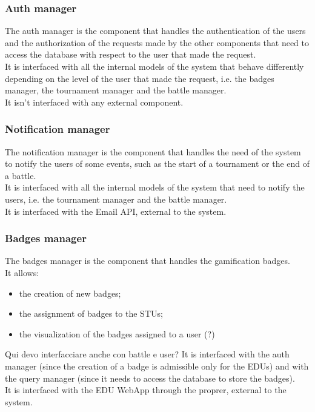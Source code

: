 \subsubsection*{Auth manager}
The auth manager is the component that handles the authentication of the users and the authorization of the requests made by the other components that need to access the database with respect to the user that made the request.\\
It is interfaced with all the internal models of the system that behave differently depending on the level of the user that made the request, i.e. the badges manager, the tournament manager and the battle manager.\\
It isn't interfaced with any external component.

\subsubsection*{Notification manager}
The notification manager is the component that handles the need of the system to notify the users of some events, such as the start of a tournament or the end of a battle.\\
It is interfaced with all the internal models of the system that need to notify the users, i.e. the tournament manager and the battle manager.\\
It is interfaced with the Email API, external to the system.

\subsubsection*{Badges manager}
The badges manager is the component that handles the gamification badges.\\
It allows:
\begin{itemize}
    \item the creation of new badges;
    \item the assignment of badges to the STUs;
    \item the visualization of the badges assigned to a user (?)
\end{itemize}
{\color{red}Qui devo interfacciare anche con battle e user?}
It is interfaced with the auth manager (since the creation of a badge is admissible only for the EDUs) and with the query manager (since it needs to access the database to store the badges).\\
It is interfaced with the EDU WebApp through the proprer, external to the system.

